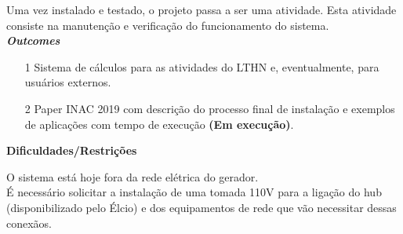 Uma vez instalado e testado, o projeto passa a ser uma atividade. Esta atividade 
consiste na manutenção e verificação do funcionamento do sistema.\\

\textbf{\textit{Outcomes}}

\begin{itemize}
	\item[1] Sistema de cálculos para as atividades do LTHN e, eventualmente, para usuários externos.
	\item[2] Paper INAC 2019 com descrição do processo final de instalação e exemplos de aplicações com tempo de execução \textbf{(Em execução)}.

\end{itemize}


\textbf{Dificuldades/Restrições}

O sistema está hoje fora da rede elétrica do gerador.\\



É necessário solicitar a instalação de uma tomada 110V para a ligação do hub 
(disponibilizado pelo Élcio) e dos equipamentos de rede que vão necessitar 
dessas conexãos.\\



